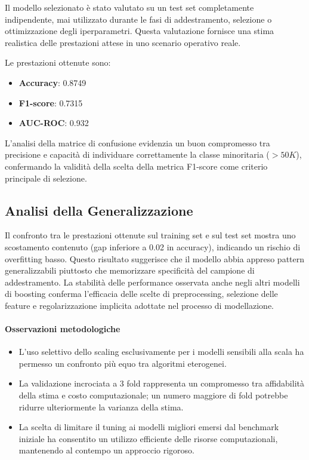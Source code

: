 \documentclass[a4paper,11pt]{article}
\begin{document}
Il modello selezionato è stato valutato su un test set completamente indipendente, mai utilizzato durante le fasi di addestramento, selezione o ottimizzazione degli iperparametri.  
Questa valutazione fornisce una stima realistica delle prestazioni attese in uno scenario operativo reale.

Le prestazioni ottenute sono:
\begin{itemize}
    \item \textbf{Accuracy}: 0.8749
    \item \textbf{F1-score}: 0.7315
    \item \textbf{AUC-ROC}: 0.932
\end{itemize}

\noindent
L’analisi della matrice di confusione evidenzia un buon compromesso tra precisione e capacità di individuare correttamente la classe minoritaria ($>50K$), confermando la validità della scelta della metrica F1-score come criterio principale di selezione.

\subsection{Analisi della Generalizzazione}

Il confronto tra le prestazioni ottenute sul training set e sul test set mostra uno scostamento contenuto (gap inferiore a 0.02 in accuracy), indicando un rischio di overfitting basso.  
Questo risultato suggerisce che il modello abbia appreso pattern generalizzabili piuttosto che memorizzare specificità del campione di addestramento. La stabilità delle performance osservata anche negli altri modelli di boosting conferma l’efficacia delle scelte di preprocessing, selezione delle feature e regolarizzazione implicita adottate nel processo di modellazione.

\paragraph{Osservazioni metodologiche}
\begin{itemize}
    \item L’uso selettivo dello scaling esclusivamente per i modelli sensibili alla scala ha permesso un confronto più equo tra algoritmi eterogenei.
    \item La validazione incrociata a 3 fold rappresenta un compromesso tra affidabilità della stima e costo computazionale; un numero maggiore di fold potrebbe ridurre ulteriormente la varianza della stima.
    \item La scelta di limitare il tuning ai modelli migliori emersi dal benchmark iniziale ha consentito un utilizzo efficiente delle risorse computazionali, mantenendo al contempo un approccio rigoroso.
\end{itemize}
\end{document}
